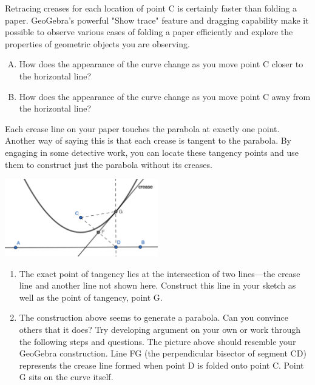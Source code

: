 \documentclass[11pt]{article}
\begin{document}
\smallskip

\noindent Retracing creases for each location of point C is certainly faster than folding a paper. GeoGebra’s powerful "Show trace" feature and dragging capability make it possible to observe various cases of folding a paper efficiently and explore the properties of geometric objects you are observing.




\vspace{0.2 in}


\begin{enumerate}[(A)]
\item How does the appearance of the curve change as you move point C closer to the horizontal line?

\item How does the appearance of the curve change as you move point C away from the horizontal line?


\end{enumerate}

\vspace{0.2 in}


\smallskip

\noindent Each crease line on your paper touches the parabola at exactly one point. Another way of saying this is that each crease is tangent to the parabola. By engaging in some detective work, you can locate these tangency points and use them to construct just the parabola without its creases.




\begin{center}
\includegraphics[width=0.5\textwidth]{figure2.png}
\end{center}

\begin{enumerate}[(1)]

\item The exact point of tangency lies at the intersection of two lines—the crease line and another line not shown here. Construct this line in your sketch as well as the point of tangency, point G.

\item The construction above seems to generate a parabola. Can you convince others that it does? Try developing argument on your own or work through the following steps and questions. The picture above should resemble your GeoGebra construction. Line FG (the perpendicular bisector of segment CD) represents the crease line formed when point D is folded onto point C. Point G sits on the curve itself.
	
\end{enumerate}
\end{document}
